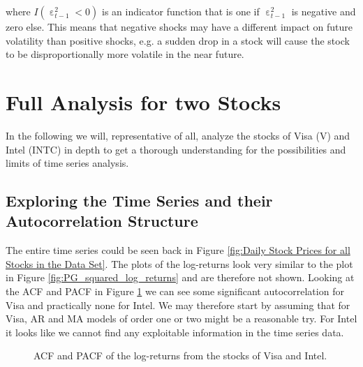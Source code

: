 where $I(\upepsilon^2_{t-1} < 0)$ is an indicator function that is one if $\upepsilon^2_{t-1}$ is negative and zero else. This means that negative shocks may have a different impact on future volatility than positive shocks, e.g. a sudden drop in a stock will cause the stock to be disproportionally more volatile in the near future. 

\section{Full Analysis for two Stocks}
In the following we will, representative of all, analyze the stocks of Visa (V) and Intel (INTC) in depth to get a thorough understanding for the possibilities and limits of time series analysis. 

\subsection{Exploring the Time Series and their Autocorrelation Structure}
The entire time series could be seen back in Figure \ref{fig:Daily Stock Prices for all Stocks in the Data Set}. The plots of the log-returns look very similar to the plot in Figure \ref{fig:PG_squared_log_returns} and are therefore not shown. Looking at the ACF and PACF in Figure \ref{fig:INTC_V_ACF_log_returns} we can see some significant autocorrelation for Visa and practically none for Intel. We may therefore start by assuming that for Visa, AR and MA models of order one or two might be a reasonable try. For Intel it looks like we cannot find any exploitable information in the time series data. 
\begin{figure}[h!]
    \centering
    \begin{adjustbox}{width=.95\textwidth,center}
    
    \end{adjustbox}
    \begin{adjustbox}{width=.95\textwidth,center}
    
    \end{adjustbox} 
    \caption{ACF and PACF of the log-returns from the stocks of Visa and Intel.}
    \label{fig:INTC_V_ACF_log_returns}
\end{figure}{}

